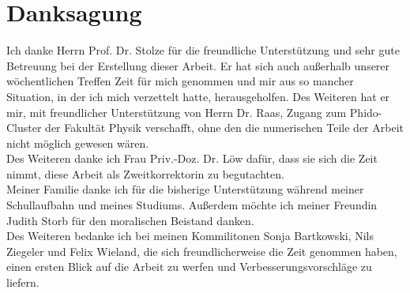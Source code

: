\chapter*{Danksagung}
Ich danke Herrn Prof. Dr. Stolze für die freundliche Unterstützung und sehr gute Betreuung bei der Erstellung dieser Arbeit. Er hat sich auch außerhalb unserer wöchentlichen Treffen Zeit für mich genommen und mir aus so mancher Situation, in der ich mich verzettelt hatte, herausgeholfen. Des Weiteren hat er mir, mit freundlicher Unterstützung von Herrn Dr. Raas, Zugang zum Phido-Cluster der Fakultät Physik verschafft, ohne den die numerischen Teile der Arbeit nicht möglich gewesen wären.\\
Des Weiteren danke ich Frau Priv.-Doz. Dr. Löw dafür, dass sie sich die Zeit nimmt, diese Arbeit als Zweitkorrektorin zu begutachten. \\
Meiner Familie danke ich für die bisherige Unterstützung während meiner Schullaufbahn und meines Studiums. Außerdem möchte ich meiner Freundin Judith Storb für den moralischen Beistand danken. \\
Des Weiteren bedanke ich bei meinen Kommilitonen Sonja Bartkowski, Nils Ziegeler und Felix Wieland, die sich freundlicherweise die Zeit genommen haben, einen ersten Blick auf die Arbeit zu werfen und Verbesserungsvorschläge zu liefern.
\thispagestyle{empty}
